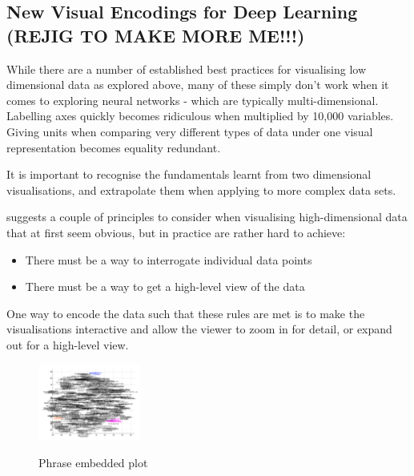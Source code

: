 \documentclass[a4paper,11pt,titlepage]{article}
\begin{document}
\subsection{New Visual Encodings for Deep Learning (REJIG TO MAKE MORE ME!!!)}

		While there are a number of established best practices for visualising low dimensional data as explored above, many of these simply don't work when it comes to exploring neural networks - which are typically multi-dimensional. Labelling axes quickly becomes ridiculous when multiplied by 10,000 variables. Giving units when comparing very different types of data under one visual representation becomes equality redundant.
		\par	 
		It is important to recognise the fundamentals learnt from two dimensional visualisations, and extrapolate them when applying to more complex data sets. 
		\par 
		\cite{Olah2014} suggests a couple of principles to consider when visualising high-dimensional data that at first seem obvious, but in practice are rather hard to achieve:
		\begin{itemize}
			\item There must be a way to interrogate individual data points
			\item There must be a way to get a high-level view of the data
		\end{itemize}
		\par 
		One way to encode the data such that these rules are met is to make the visualisations interactive and allow the viewer to zoom in for detail, or expand out for a high-level view. 
		\par 
 		 		
 	\begin{figure}[H]
    			\centering	
			{{\includegraphics[width=0.3\textwidth]
    				{img/word_embeddings_messy.png} 
    			}}%
    			\caption{Phrase embedded plot}%
    		\label{fig:mnistHintonEmbedded}
	\end{figure}
 		
\end{document}
